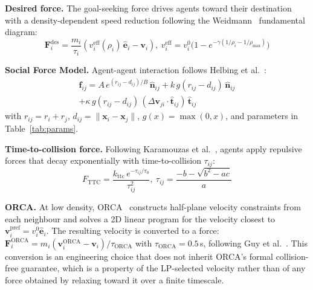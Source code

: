 \documentclass[a4paper,twoside]{article}
\begin{document}
\textbf{Desired force.}
The goal-seeking force drives agents toward their destination with a density-dependent speed reduction following the Weidmann~\cite{Weidmann93} fundamental diagram:
\begin{equation}\label{eq:desired}
    \mathbf{F}_i^{\text{des}} = \frac{m_i}{\tau_i}\left(v_i^{\text{eff}}(\rho_i)\,\hat{\mathbf{e}}_i - \mathbf{v}_i\right),\ v_i^{\text{eff}} = v_i^0\bigl(1 - e^{-\gamma(1/\rho_i - 1/\rho_{\max})}\bigr)
\end{equation}

\textbf{Social Force Model.}
Agent-agent interaction follows Helbing et al.~\cite{Helbing00}:
\begin{multline}\label{eq:sfm}
    \mathbf{f}_{ij} = A\,e^{(r_{ij} - d_{ij})/B}\,\hat{\mathbf{n}}_{ij} + k\,g(r_{ij} - d_{ij})\,\hat{\mathbf{n}}_{ij} \\
    + \kappa\,g(r_{ij} - d_{ij})\,(\Delta\mathbf{v}_{ji}\cdot\hat{\mathbf{t}}_{ij})\,\hat{\mathbf{t}}_{ij}
\end{multline}
with $r_{ij}=r_i+r_j$, $d_{ij}=\|\mathbf{x}_i-\mathbf{x}_j\|$, $g(x)=\max(0,x)$, and parameters in Table~\ref{tab:params}.

\textbf{Time-to-collision force.}
Following Karamouzas et al.~\cite{Karamouzas14}, agents apply repulsive forces that decay exponentially with time-to-collision $\tau_{ij}$:
\begin{equation}\label{eq:ttc}
    F_{\text{TTC}} = \frac{k_{\text{ttc}}\,e^{-\tau_{ij}/\tau_0}}{\tau_{ij}^2},\ \tau_{ij} = \frac{-b - \sqrt{b^2-ac}}{a}
\end{equation}

\textbf{ORCA.}
At low density, ORCA~\cite{VandenBerg11} constructs half-plane velocity constraints from each neighbour and solves a 2D linear program for the velocity closest to $\mathbf{v}_i^{\text{pref}}=v_i^0\hat{\mathbf{e}}_i$. The resulting velocity is converted to a force: $\mathbf{F}_i^{\text{ORCA}} = m_i(\mathbf{v}_i^{\text{ORCA}}-\mathbf{v}_i)/\tau_{\text{ORCA}}$ with $\tau_{\text{ORCA}}=0.5$\,s, following Guy et al.~\cite{Guy10}. This conversion is an engineering choice that does not inherit ORCA's formal collision-free guarantee, which is a property of the LP-selected velocity rather than of any force obtained by relaxing toward it over a finite timescale.
\end{document}
